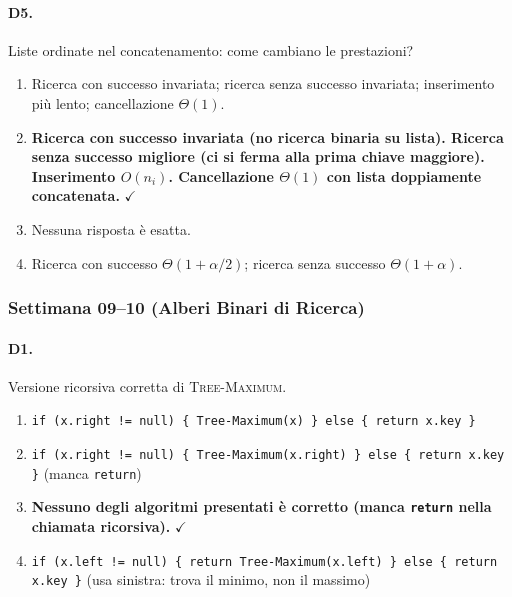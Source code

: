 \paragraph{D5.} Liste ordinate nel concatenamento: come cambiano le prestazioni?
\begin{enumerate}[label=\Alph*.,leftmargin=*]
	\item Ricerca con successo invariata; ricerca senza successo invariata; inserimento pi\`u lento; cancellazione $\Theta(1)$.
	\item \textcolor{correctgreen}{\textbf{Ricerca con successo invariata (no ricerca binaria su lista). Ricerca senza successo migliore (ci si ferma alla prima chiave maggiore). Inserimento $O(n_i)$. Cancellazione $\Theta(1)$ con lista doppiamente concatenata.}} \hfill\textcolor{correctgreen}{$\checkmark$}
	\item Nessuna risposta \`e esatta.
	\item Ricerca con successo $\Theta(1+\alpha/2)$; ricerca senza successo $\Theta(1+\alpha)$.
\end{enumerate}

\subsubsection{Settimana 09--10 (Alberi Binari di Ricerca)}

\paragraph{D1.} Versione ricorsiva corretta di \textsc{Tree-Maximum}.
\begin{enumerate}[label=\Alph*.,leftmargin=*]
	\item \texttt{if (x.right != null) \{ Tree-Maximum(x) \} else \{ return x.key \}}
	\item \texttt{if (x.right != null) \{ Tree-Maximum(x.right) \} else \{ return x.key \}} (manca \texttt{return})
	\item \textcolor{correctgreen}{\textbf{Nessuno degli algoritmi presentati \`e corretto (manca \texttt{return} nella chiamata ricorsiva).}} \hfill\textcolor{correctgreen}{$\checkmark$}
	\item \texttt{if (x.left != null) \{ return Tree-Maximum(x.left) \} else \{ return x.key \}} (usa sinistra: trova il minimo, non il massimo)
\end{enumerate}

